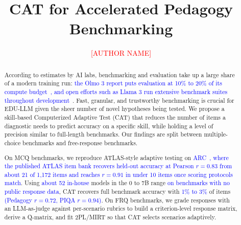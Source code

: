 \documentclass[manuscript,nonacm,review]{acmart}
\newcommand{\aiadd}[1]{\textcolor{blue}{#1}}
\begin{document}
\title{CAT for Accelerated Pedagogy Benchmarking}

\author{\textcolor{red}{[AUTHOR NAME]}}
\affiliation{%
  \institution{\textcolor{red}{[AFFILIATION]}}
  \country{}
}
\email{}

\begin{abstract}
According to estimates by AI labs, benchmarking and evaluation take up a large
share of a modern training run: \aiadd{the Olmo 3 report puts evaluation at
10\% to 20\% of its compute budget}~\cite{olmo3}\aiadd{, and open efforts such
as Llama 3 run extensive benchmark suites throughout development}~\cite{llama3herd}.
Fast, granular, and trustworthy benchmarking is crucial for EDU-LLM given the
sheer number of novel hypotheses being tested. We propose a skill-based
Computerized Adaptive Test (CAT) that reduces the number of items a diagnostic
needs to predict accuracy on a specific skill, while holding a level of
precision similar to full-length benchmarks. Our findings are split between
multiple-choice benchmarks and free-response benchmarks.

On MCQ benchmarks, we reproduce ATLAS-style adaptive testing on
\aiadd{ARC}~\cite{li2025atlas}\aiadd{, where the published ATLAS item bank
recovers held-out accuracy at Pearson $r = 0.83$ from about 21 of 1,172 items
and reaches $r = 0.91$ in under 10 items once scoring protocols match}. Using
\aiadd{about 52 in-house} models in the 0 to 7B range \aiadd{on benchmarks
with no public response data}, CAT recovers full benchmark accuracy with
\aiadd{1\% to 3\%} of items \aiadd{(Pedagogy $r = 0.72$, PIQA $r = 0.94$)}. On
FRQ benchmarks, we grade responses with an LLM-as-judge against per-scenario
rubrics to build a criterion-level response matrix, derive a Q-matrix, and fit
2PL/MIRT so that CAT selects scenarios adaptively.
\end{abstract}

\maketitle
\end{document}
